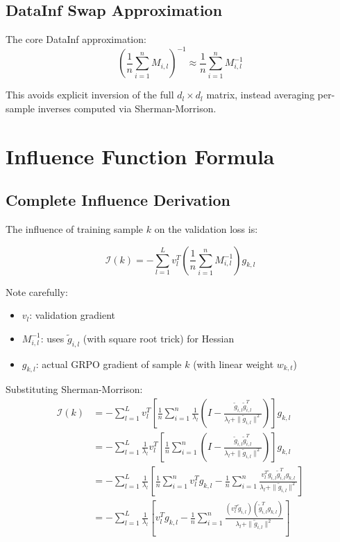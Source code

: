 \documentclass{article}
\begin{document}
\subsection{DataInf Swap Approximation}

The core DataInf approximation:
\begin{equation}
\left(\frac{1}{n}\sum_{i=1}^n M_{i,l}\right)^{-1} \approx \frac{1}{n}\sum_{i=1}^n M_{i,l}^{-1}
\end{equation}

This avoids explicit inversion of the full $d_l \times d_l$ matrix, instead averaging per-sample inverses computed via Sherman-Morrison.

\section{Influence Function Formula}

\subsection{Complete Influence Derivation}

The influence of training sample $k$ on the validation loss is:

\begin{equation}
\mathcal{I}(k) = -\sum_{l=1}^L v_l^T \left(\frac{1}{n}\sum_{i=1}^n M_{i,l}^{-1}\right) g_{k,l}
\end{equation}

Note carefully:
\begin{itemize}
    \item $v_l$: validation gradient
    \item $M_{i,l}^{-1}$: uses $\tilde{g}_{i,l}$ (with square root trick) for Hessian
    \item $g_{k,l}$: actual GRPO gradient of sample $k$ (with linear weight $w_{k,t}$)
\end{itemize}

Substituting Sherman-Morrison:
\begin{align}
\mathcal{I}(k) &= -\sum_{l=1}^L v_l^T \left[\frac{1}{n}\sum_{i=1}^n \frac{1}{\lambda_l}\left(I - \frac{\tilde{g}_{i,l}\tilde{g}_{i,l}^T}{\lambda_l + \|\tilde{g}_{i,l}\|^2}\right)\right] g_{k,l} \\
&= -\sum_{l=1}^L \frac{1}{\lambda_l} v_l^T \left[\frac{1}{n}\sum_{i=1}^n \left(I - \frac{\tilde{g}_{i,l}\tilde{g}_{i,l}^T}{\lambda_l + \|\tilde{g}_{i,l}\|^2}\right)\right] g_{k,l} \\
&= -\sum_{l=1}^L \frac{1}{\lambda_l} \left[\frac{1}{n}\sum_{i=1}^n v_l^T g_{k,l} - \frac{1}{n}\sum_{i=1}^n \frac{v_l^T \tilde{g}_{i,l} \tilde{g}_{i,l}^T g_{k,l}}{\lambda_l + \|\tilde{g}_{i,l}\|^2}\right] \\
&= -\sum_{l=1}^L \frac{1}{\lambda_l} \left[v_l^T g_{k,l} - \frac{1}{n}\sum_{i=1}^n \frac{(v_l^T \tilde{g}_{i,l})(\tilde{g}_{i,l}^T g_{k,l})}{\lambda_l + \|\tilde{g}_{i,l}\|^2}\right]
\end{align}
\end{document}
